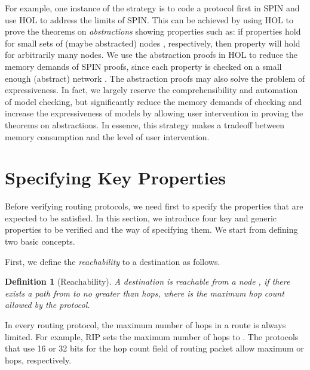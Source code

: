 \documentclass[a4paper,10pt,twocolumn]{article}
\newtheorem{definition}[theorem]{Definition}
\begin{document}
For example, one instance of the strategy is to code a protocol first in SPIN and use HOL to address the limits of SPIN. This can be achieved by using HOL to prove the theorems on \emph{abstractions} showing properties such as: if properties  hold for small sets of (maybe abstracted) nodes , respectively, then property  will hold for arbitrarily many nodes. We use the abstraction proofs in HOL to reduce the memory demands of SPIN proofs, since each property  is checked on a small enough (abstract) network . The abstraction proofs may also solve the problem of expressiveness. In fact, we largely reserve the comprehensibility and automation of model checking, but significantly reduce the memory demands of checking and increase the expressiveness of models by allowing user intervention in proving the theorems on abstractions. In essence, this strategy makes a tradeoff between memory consumption and the level of user intervention.

\section{Specifying Key Properties}
\label{Sec:prop}
Before verifying routing protocols, we need first to specify the properties that are expected to be satisfied. In this section, we introduce four key and generic properties to be verified and the way of specifying them. We start from defining two basic concepts.

First, we define the \emph{reachability} to a destination as follows.
\begin{definition}[Reachability]
A destination  is \emph{reachable} from a node , if there exists a path from  to  no greater than  hops, where  is the maximum hop count allowed by the protocol.
\end{definition}
In every routing protocol, the maximum number of hops in a route is always limited. For example, RIP sets the maximum number of hops to . The protocols that use 16 or 32 bits for the hop count field of routing packet allow maximum  or  hops, respectively.
\end{document}
